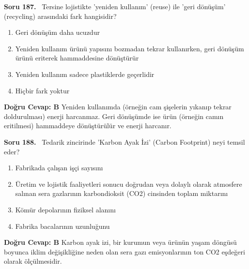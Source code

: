 \documentclass[11pt,a4paper,openany]{book}
\begin{document}
\needspace{5cm}
\vspace{8pt}
\noindent\textbf{\large\sffamily Soru 187.} \ Tersine lojistikte 'yeniden kullanım' (reuse) ile 'geri dönüşüm' (recycling) arasındaki fark hangisidir?
\begin{enumerate}[label=\Alph*), leftmargin=25pt, topsep=4pt, itemsep=2pt]
    \item Geri dönüşüm daha ucuzdur
    \item Yeniden kullanım ürünü yapısını bozmadan tekrar kullanırken, geri dönüşüm ürünü eriterek hammaddesine dönüştürür
    \item Yeniden kullanım sadece plastiklerde geçerlidir
    \item Hiçbir fark yoktur
\end{enumerate}
\vspace{4pt}
\begin{tcolorbox}[title=Cevap ve Açıklama, colback=gray!3!white, colframe=primarycolor!90!black, arc=2mm, fonttitle=\bfseries\sffamily, top=6pt, bottom=6pt]
    \textbf{Doğru Cevap: B}
    \vspace{2pt}
    Yeniden kullanımda (örneğin cam şişelerin yıkanıp tekrar doldurulması) enerji harcanmaz. Geri dönüşümde ise ürün (örneğin camın eritilmesi) hammaddeye dönüştürülür ve enerji harcanır.
\end{tcolorbox}
\vspace{10pt}

\needspace{5cm}
\vspace{8pt}
\noindent\textbf{\large\sffamily Soru 188.} \ Tedarik zincirinde 'Karbon Ayak İzi' (Carbon Footprint) neyi temsil eder?
\begin{enumerate}[label=\Alph*), leftmargin=25pt, topsep=4pt, itemsep=2pt]
    \item Fabrikada çalışan işçi sayısını
    \item Üretim ve lojistik faaliyetleri sonucu doğrudan veya dolaylı olarak atmosfere salınan sera gazlarının karbondioksit (CO2) cinsinden toplam miktarını
    \item Kömür depolarının fiziksel alanını
    \item Fabrika bacalarının uzunluğunu
\end{enumerate}
\vspace{4pt}
\begin{tcolorbox}[title=Cevap ve Açıklama, colback=gray!3!white, colframe=primarycolor!90!black, arc=2mm, fonttitle=\bfseries\sffamily, top=6pt, bottom=6pt]
    \textbf{Doğru Cevap: B}
    \vspace{2pt}
    Karbon ayak izi, bir kurumun veya ürünün yaşam döngüsü boyunca iklim değişikliğine neden olan sera gazı emisyonlarının ton CO2 eşdeğeri olarak ölçülmesidir.
\end{tcolorbox}
\vspace{10pt}
\end{document}
